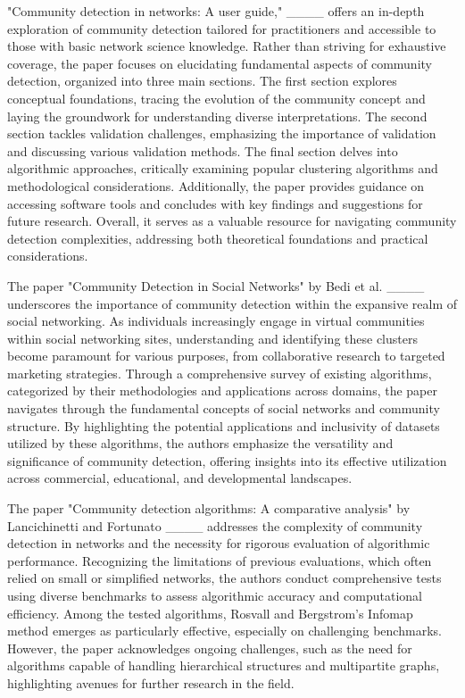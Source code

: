 "Community detection in networks: A user guide," ____ offers an in-depth exploration of community detection tailored for practitioners and accessible to those with basic network science knowledge. Rather than striving for exhaustive coverage, the paper focuses on elucidating fundamental aspects of community detection, organized into three main sections. The first section explores conceptual foundations, tracing the evolution of the community concept and laying the groundwork for understanding diverse interpretations. The second section tackles validation challenges, emphasizing the importance of validation and discussing various validation methods. The final section delves into algorithmic approaches, critically examining popular clustering algorithms and methodological considerations. Additionally, the paper provides guidance on accessing software tools and concludes with key findings and suggestions for future research. Overall, it serves as a valuable resource for navigating community detection complexities, addressing both theoretical foundations and practical considerations.

The paper "Community Detection in Social Networks" by Bedi et al. ____ underscores the importance of community detection within the expansive realm of social networking. As individuals increasingly engage in virtual communities within social networking sites, understanding and identifying these clusters become paramount for various purposes, from collaborative research to targeted marketing strategies. Through a comprehensive survey of existing algorithms, categorized by their methodologies and applications across domains, the paper navigates through the fundamental concepts of social networks and community structure. By highlighting the potential applications and inclusivity of datasets utilized by these algorithms, the authors emphasize the versatility and significance of community detection, offering insights into its effective utilization across commercial, educational, and developmental landscapes.

The paper "Community detection algorithms: A comparative analysis" by Lancichinetti and Fortunato ____ addresses the complexity of community detection in networks and the necessity for rigorous evaluation of algorithmic performance. Recognizing the limitations of previous evaluations, which often relied on small or simplified networks, the authors conduct comprehensive tests using diverse benchmarks to assess algorithmic accuracy and computational efficiency. Among the tested algorithms, Rosvall and Bergstrom's Infomap method emerges as particularly effective, especially on challenging benchmarks. However, the paper acknowledges ongoing challenges, such as the need for algorithms capable of handling hierarchical structures and multipartite graphs, highlighting avenues for further research in the field.